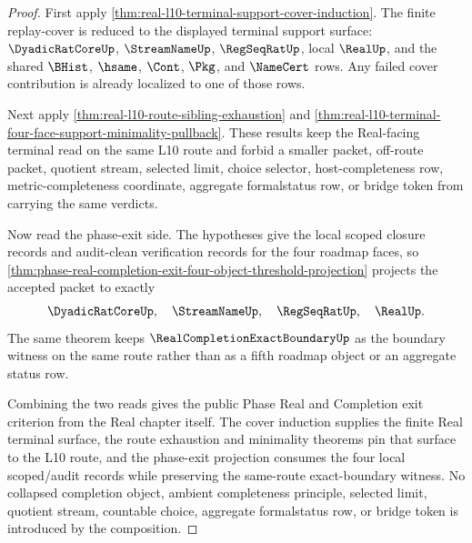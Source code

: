 \begin{proof}
First apply \autoref{thm:real-l10-terminal-support-cover-induction}. The
finite replay-cover is reduced to the displayed terminal support surface:
$\DyadicRatCoreUp$, $\StreamNameUp$, $\RegSeqRatUp$, local $\RealUp$, and the
shared $\BHist$, $\hsame$, $\Cont$, $\Pkg$, and $\NameCert$ rows. Any failed
cover contribution is already localized to one of those rows.

Next apply \autoref{thm:real-l10-route-sibling-exhaustion} and
\autoref{thm:real-l10-terminal-four-face-support-minimality-pullback}. These
results keep the Real-facing terminal read on the same L10 route and forbid a
smaller packet, off-route packet, quotient stream, selected limit, choice
selector, host-completeness row, metric-completeness coordinate, aggregate
formalstatus row, or bridge token from carrying the same verdicts.

Now read the phase-exit side. The hypotheses give the local scoped closure
records and audit-clean verification records for the four roadmap faces, so
\autoref{thm:phase-real-completion-exit-four-object-threshold-projection}
projects the accepted packet to exactly
$$
\DyadicRatCoreUp,\quad \StreamNameUp,\quad \RegSeqRatUp,\quad \RealUp.
$$
The same theorem keeps $\RealCompletionExactBoundaryUp$ as the boundary
witness on the same route rather than as a fifth roadmap object or an
aggregate status row.

Combining the two reads gives the public Phase Real and Completion exit
criterion from the Real chapter itself. The cover induction supplies the
finite Real terminal surface, the route exhaustion and minimality theorems
pin that surface to the L10 route, and the phase-exit projection consumes the
four local scoped/audit records while preserving the same-route exact-boundary
witness. No collapsed completion object, ambient completeness principle,
selected limit, quotient stream, countable choice, aggregate formalstatus
row, or bridge token is introduced by the composition.
\end{proof}

